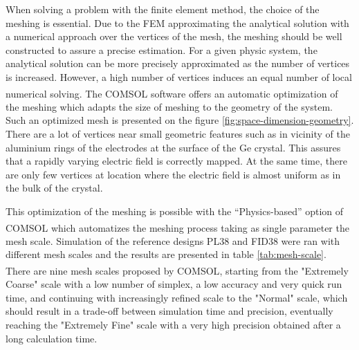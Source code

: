 When solving a problem with the finite element method, the choice of the meshing is essential. Due to the FEM approximating the analytical solution with a numerical approach over the vertices of the mesh, the meshing should be well constructed to assure a precise estimation. For a given physic system, the analytical solution can be more precisely approximated as the number of vertices is increased. However, a high number of vertices induces an equal number of local numerical solving. The COMSOL\textsuperscript{\textregistered} software offers an automatic optimization of the meshing which adapts the size of meshing to the geometry of the system. Such an optimized mesh is presented on the figure \ref{fig:space-dimension-geometry}. There are a lot of vertices near small geometric features such as in vicinity of the aluminium rings of the electrodes at the surface of the Ge crystal. This assures that a rapidly varying electric field is correctly mapped. At the same time, there are only few vertices at location where the electric field is almost uniform as in the bulk of the crystal.

This optimization of the meshing is possible with the “Physics-based” option of COMSOL\textsuperscript{\textregistered} which automatizes the meshing process taking as single parameter the mesh scale. Simulation of the reference designs PL38 and FID38 were ran with different mesh scales and the results are presented in table \ref{tab:mesh-scale}. There are nine mesh scales proposed by COMSOL\textsuperscript{\textregistered}, starting from the "Extremely Coarse" scale with a low number of simplex, a low accuracy and very quick run time, and continuing with increasingly refined scale to the "Normal" scale, which should result in a trade-off between simulation time and precision, eventually reaching the "Extremely Fine" scale with a very high precision obtained after a long calculation time. 

